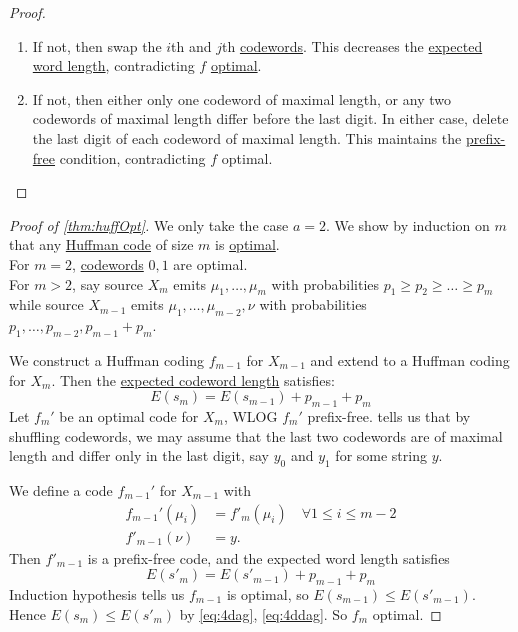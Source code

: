 \documentclass{article}
\newcommand{\1}[1]{\mathbbm{1}_{#1}}
\begin{document}
\begin{proof}
    \leavevmode
    \begin{enumerate}[label=\roman*)]
        \item If not, then swap the $i$th and $j$th \hyperlink{def:codewords}{codewords}.
            This decreases the \hyperlink{def:ewl}{expected word length}, contradicting $f$ \hyperlink{def:optCode}{optimal}.
        \item If not, then either only one codeword of maximal length, or any two codewords of maximal length differ before the last digit.
            In either case, delete the last digit of each codeword of maximal length.
            This maintains the \hyperlink{def:prefixFreeCode}{prefix-free} condition, contradicting $f$ optimal. \qedhere
    \end{enumerate}
\end{proof}
\begin{proof}[Proof of \cref{thm:huffOpt}]
    We only take the case $a=2$.
    We show by induction on $m$ that any \hyperlink{def:huffmanCode}{Huffman code} of size $m$ is \hyperlink{def:optCode}{optimal}. \\
    For $m=2$, \hyperlink{def:code}{codewords} $0,1$ are optimal. \\
    For $m>2$, say source $X_m$ emits $\mu_1, \dotsc, \mu_m$ with probabilities $p_1 \geq p_2 \geq \dotsc \geq p_m$ while source $X_{m-1}$ emits $\mu_1, \dotsc, \mu_{m-2}, \nu$ with probabilities $p_1, \dotsc, p_{m-2}, p_{m-1} + p_m$.

    We construct a Huffman coding $f_{m-1}$ for $X_{m-1}$ and extend to a Huffman coding for $X_m$.
    Then the \hyperlink{def:ewl}{expected codeword length} satisfies:
    \begin{equation*}
        E(s_m) = E(s_{m-1}) + p_{m-1} + p_m \label{eq:4dag} \tag{$\dagger$}
    \end{equation*}
    Let $f_m'$ be an optimal code for $X_m$, WLOG $f_m'$ prefix-free.
     tells us that by shuffling codewords, we may assume that the last two codewords are of maximal length and differ only in the last digit, say $y_0$ and $y_1$ for some string $y$.

    We define a code $f_{m-1}'$ for $X_{m-1}$ with
    \begin{align*}
        f_{m-1}'(\mu_i) &= f'_m(\mu_i) \quad \forall 1 \leq i \leq m-2 \\
        f'_{m-1}(\nu) &= y.
    \end{align*}
    Then $f'_{m-1}$ is a prefix-free code, and the expected word length satisfies
    \begin{equation*}
        E(s'_m) = E(s'_{m-1}) + p_{m-1} + p_m \tag{$\ddagger$} \label{eq:4ddag}
    \end{equation*}
    Induction hypothesis tells us $f_{m-1}$ is optimal, so $E(s_{m-1}) \leq E(s'_{m-1})$. Hence $E(s_m) \leq E(s'_m)$ by \eqref{eq:4dag}, \eqref{eq:4ddag}.
    So $f_m$ optimal.
\end{proof}
\end{document}

